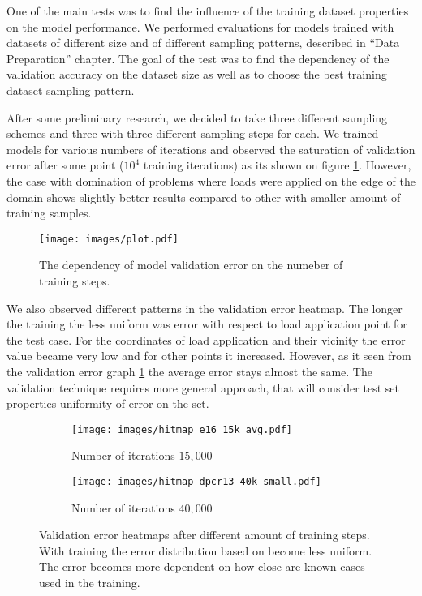 One of the main tests was to find the influence of the training dataset properties on the model performance.
We performed evaluations for models trained with datasets of different size and of different sampling patterns, described in ``Data Preparation'' chapter.
The goal of the test was to find the dependency of the validation accuracy on the dataset size as well as to choose the best training dataset sampling pattern.
\medskip
 
After some preliminary research, we decided to take three different sampling schemes and three with three different sampling steps for each. 
We trained models for various numbers of iterations and observed the saturation of validation error after some point ($10^4$ training iterations) as its shown on figure \ref{fig:mse_vs_steps}.
However, the case with domination of problems where loads were applied on the edge of the domain shows slightly better results compared to other with smaller amount of training samples.
\begin{figure}[H]
	\centering
	\texttt{[image: images/plot.pdf]}
	\caption{The dependency of model validation error on the numeber of training steps.}
	\label{fig:mse_vs_steps}
\end{figure}
We also observed different patterns in the validation error heatmap.
The longer the training the less uniform was error with respect to load application point for the test case. 
For the coordinates of load application and their vicinity the error value became very low and for other points it increased. 
However, as it seen from the validation error graph \ref{fig:mse_vs_steps} the average error stays almost the same.
The validation technique requires more general approach, that will consider test set properties uniformity of error on the set.

\begin{figure}[h]
	\centering
	\begin{subfigure}[b]{0.4\linewidth}
		\centering
		\texttt{[image: images/hitmap\_e16\_15k\_avg.pdf]}
		\caption{Number of iterations $15,000$}
		\label{fig:heatmaps_overfit_1}
	\end{subfigure}
	\begin{subfigure}[b]{0.4\linewidth}
		\centering
		\texttt{[image: images/hitmap\_dpcr13-40k\_small.pdf]}
		\caption{Number of iterations $40,000$}
		\label{fig:heatmaps_overfit_2}
	\end{subfigure}
	\caption{Validation error heatmaps after different amount of training steps. With training the error distribution based on become less uniform. The error becomes more dependent on how close are known cases used in the training.}
	\label{fig:heatmaps_overfit}
\end{figure}

